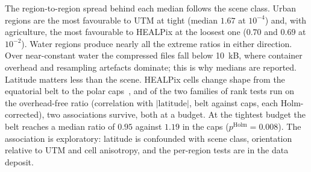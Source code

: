 The region-to-region spread behind each median follows the scene class.
Urban regions are the most favourable to UTM at tight  (median
$1.67$ at $10^{-4}$) and, with agriculture, the most favourable to
HEALPix at the loosest one ($0.70$ and $0.69$ at $10^{-2}$). Water
regions produce nearly all the extreme ratios in either direction. Over
near-constant water the compressed files fall below \SI{10}{kB}, where
container overhead and resampling artefacts dominate; this is why
medians are reported. Latitude matters less than the scene. HEALPix
cells change shape from the equatorial belt to the polar
caps~\cite{kmoch2022distortions}, and of the two families of rank tests
run on the overhead-free ratio (correlation with $|\mathrm{latitude}|$,
belt against caps, each Holm-corrected), two associations survive, both
at a  budget. At the tightest budget the belt reaches a
median ratio of $0.95$ against $1.19$ in the caps
($p^{\mathrm{Holm}}=0.008$). The association is exploratory: latitude
is confounded with scene class, orientation relative to UTM and cell
anisotropy, and the per-region tests are in the data deposit.
